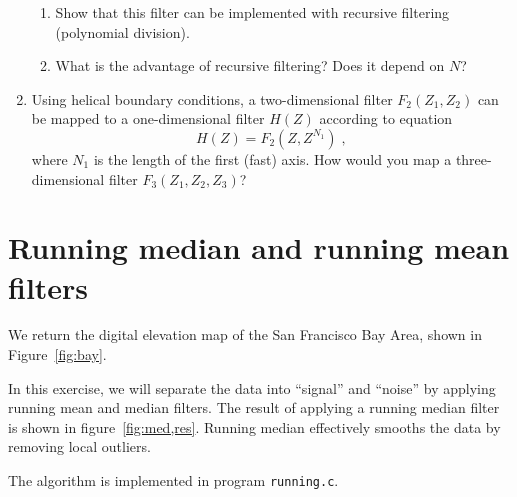 \begin{enumerate}
\begin{enumerate}
\item Show that this filter can be implemented with recursive filtering (polynomial division).
\item What is the advantage of recursive filtering? Does it depend on $N$?
\end{enumerate}

\item Using helical boundary conditions, a two-dimensional filter $F_2(Z_1,Z_2)$ can be mapped 
to a one-dimensional filter $H(Z)$ according to equation
\begin{equation}
\label{eq:helix}
H(Z) = F_2\left(Z,Z^{N_1}\right)\;,
\end{equation} 
where $N_1$ is the length of the first (fast) axis. How would you map
a three-dimensional filter $F_3(Z_1,Z_2,Z_3)$?

\end{enumerate}

\newpage

\section{Running median and running mean filters}


We return the digital elevation map of the San Francisco Bay Area, shown in Figure~\ref{fig:bay}.

In this exercise, we will separate the data into ``signal'' and
``noise'' by applying running mean and median filters.  The result of
applying a running median filter is shown in
figure~\ref{fig:med,res}. Running median effectively smooths the data
by removing local outliers.



The algorithm is implemented in program \texttt{running.c}.



